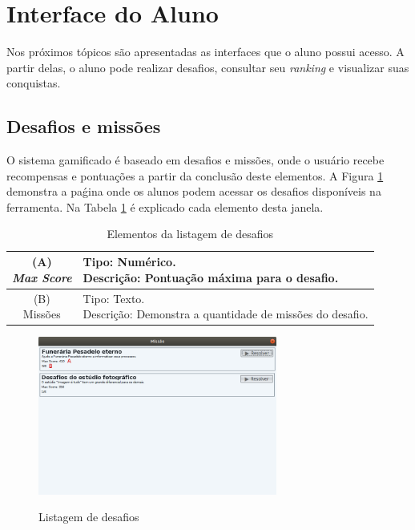 \documentclass[
	12pt,				%
	oneside,			%
	a4paper,			%
	english,			%
	french,				%
	spanish,			%
	brazil,				%
	]{abntex2}
\begin{document}
\section{Interface do Aluno}

Nos próximos tópicos são apresentadas as interfaces que o aluno possui acesso. A partir delas, o aluno pode realizar desafios, consultar seu \textit{ranking} e visualizar suas conquistas.

\subsection{Desafios e missões}

O sistema gamificado é baseado em desafios e missões, onde o usuário recebe recompensas e pontuações a partir da conclusão deste elementos. A Figura \ref{fig:visnodeDesafios} demonstra a paǵina onde os alunos podem acessar os desafios disponíveis na ferramenta. Na Tabela \ref{tab:listagemDesafios} é explicado cada elemento desta janela.

\begin{table}[H]
\centering
\caption{Elementos da listagem de desafios} \label{tab:listagemDesafios}
\renewcommand{\arraystretch}{1.8}
\setlength{\tabcolsep}{10pt}
\begin{tabular}{|c|l|}
  \hline
  \makecell{(A) \\ \textit{Max Score}} 
  &
  \makecell[l]{Tipo: Numérico.\\ Descrição: Pontuação máxima para o desafio.} \\
  \hline
  \makecell{(B) \\ Missões} 
  &
  \makecell[l]{Tipo: Texto.\\ Descrição: Demonstra a quantidade de missões do desafio.} \\
  \hline
\end{tabular}
\centering
\sourceAuthor
\end{table}

\begin{figure}[H]
\centering
\caption{Listagem de desafios}
\includegraphics[width=0.7\textwidth]{imagens/visnode_desafios.png}
\sourceAuthor
\label{fig:visnodeDesafios}
\end{figure}
\end{document}
